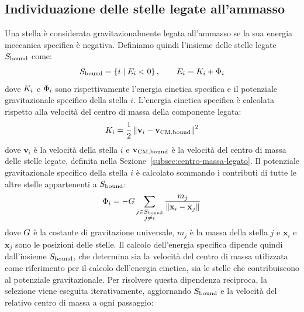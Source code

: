 \subsection{Individuazione delle stelle legate all'ammasso}
\label{subsec:stelle-legate}
Una stella è considerata gravitazionalmente legata all'ammasso se la sua energia meccanica specifica è negativa. Definiamo quindi l'insieme delle stelle legate $S_{\mathrm{bound}}$ come:
\begin{equation}
	S_{\mathrm{bound}} = \left\{i \mid E_i < 0\right\},
	\qquad E_i = K_i + \Phi_i
	\label{eq:bound-stars}
\end{equation}
dove $K_i$ e $\Phi_i$ sono rispettivamente l'energia cinetica specifica e il potenziale gravitazionale specifico della stella $i$.
L'energia cinetica specifica è calcolata rispetto alla velocità del centro di massa della componente legata:
\begin{equation}
	K_i = \frac{1}{2}
	\left\|\mathbf{v}_i-\mathbf{v}_{\mathrm{CM,bound}}\right\|^2
	\label{eq:stellar-kinetic-energy}
\end{equation}
dove $\mathbf{v}_i$ è la velocità della stella $i$ e $\mathbf{v}_{\mathrm{CM,bound}}$ è la velocità del centro di massa delle stelle legate, definita nella Sezione~\ref{subsec:centro-massa-legato}.
Il potenziale gravitazionale specifico della stella $i$ è calcolato sommando i contributi di tutte le altre stelle appartenenti a $S_{\mathrm{bound}}$:
\begin{equation}
	\Phi_i = -G \sum_{\substack{j \in S_{\mathrm{bound}} \\ j \neq i}}
	\frac{m_j}{\left\|\mathbf{x}_i-\mathbf{x}_j\right\|}
	\label{eq:stellar-potential}
\end{equation}
dove $G$ è la costante di gravitazione universale, $m_j$ è la massa della stella $j$ e $\mathbf{x}_i$ e $\mathbf{x}_j$ sono le posizioni delle stelle.
Il calcolo dell'energia specifica dipende quindi dall'insieme $S_{\mathrm{bound}}$, che determina sia la velocità del centro di massa utilizzata come riferimento per il calcolo dell'energia cinetica, sia le stelle che contribuiscono al potenziale gravitazionale. Per risolvere questa dipendenza reciproca, la selezione viene eseguita iterativamente, aggiornando $S_{\mathrm{bound}}$ e la velocità del relativo centro di massa a ogni passaggio:
